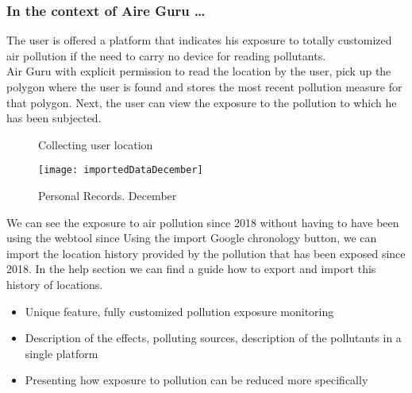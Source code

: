 \subsubsection*{In the context of Aire Guru \ldots} 

The user is offered a platform that indicates his exposure to totally customized air pollution if the need to carry
no device for reading pollutants.\\

Air Guru with explicit permission to read the location by the user, pick up the polygon where
the user is found and stores the most recent pollution measure for that polygon. Next, the
user can view the exposure to the pollution to which he has been subjected.

\begin{figure}[ht]
    \centering 
    \caption{Collecting user location}
\end{figure}

\begin{figure}[ht]
    \centering
    \texttt{[image: importedDataDecember]}
    \caption{Personal Records. December}
\end{figure}

We can see the exposure to air pollution since 2018 without having to have been using the webtool since
Using the import Google chronology button, we can import the location history provided by the
pollution that has been exposed since 2018. In the help section we can find a guide how to
export and import this history of locations.

\begin{itemize}
    \item Unique feature, fully customized pollution exposure monitoring
    \item Description of the effects, polluting sources, description of the pollutants in a single platform
    \item Presenting how exposure to pollution can be reduced more specifically
\end{itemize}